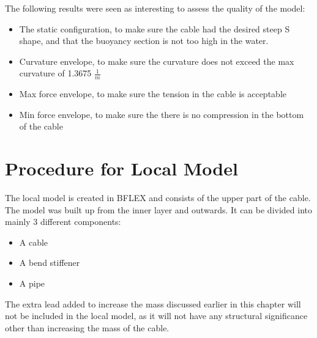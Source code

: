 The following results were seen as interesting to assess the quality of the model:
\begin{itemize}
    \item The static configuration, to make sure the cable had the desired steep S shape, and that the buoyancy section is not too high in the water.
    \item Curvature envelope, to make sure the curvature does not exceed the max curvature of 1.3675 $\frac{1}{m}$
    \item Max force envelope, to make sure the tension in the cable is acceptable
    \item Min force envelope, to make sure the there is no compression in the bottom of the cable

\end{itemize}

\section{Procedure for Local Model}
The local model is created in BFLEX and consists of the upper part of the cable. The model was built up from the inner layer and outwards. It can be divided into mainly 3 different components:
\begin{itemize}
    \item A cable
    \item A bend stiffener
    \item A pipe
\end{itemize}

\noindent The extra lead added to increase the mass discussed earlier in this chapter will not be included in the local model, as it will not have any structural significance other than increasing the mass of the cable.\newline
\newline
